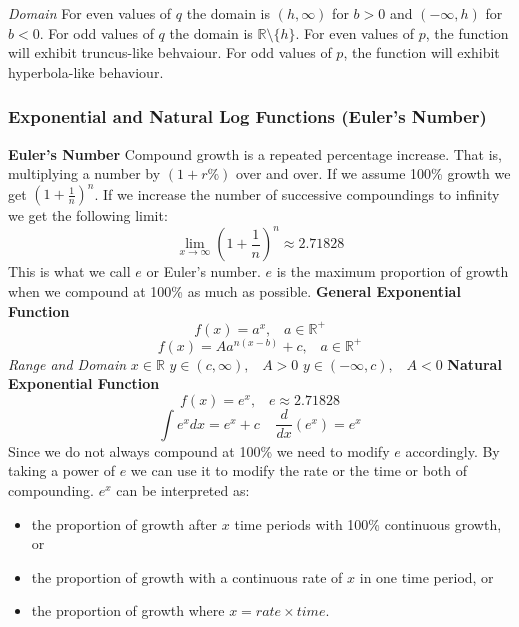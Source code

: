 \documentclass{article}
\begin{document}
				\textit{Domain}\newline
				For even values of $q$ the domain is $(h,\infty)$ for $b>0$ and $(-\infty,h)$ for $b<0$.\newline
				For odd values of $q$ the domain is $\mathbb{R}\setminus\{h\}$.
				\newline\newline
				For even values of $p$, the function will exhibit truncus-like behvaiour. For odd values of $p$, the function will exhibit hyperbola-like behaviour.
			\subsubsection{Exponential and Natural Log Functions (Euler's Number)}
				\textbf{Euler's Number}\newline
				Compound growth is a repeated percentage increase. That is, multiplying a number by $(1+r\%)$ over and over. If we assume 100\% growth we get $(1+\frac{1}{n})^n$. If we increase the number of successive compoundings to infinity we get the following limit:
				\[\lim_{x\to\infty}\left(1+\frac{1}{n}\right)^n\approx2.71828\]
				This is what we call $e$ or Euler's number. $e$ is the maximum proportion of growth when we compound at 100\% as much as possible.\newline\newline
				\textbf{General Exponential Function}
				\[f(x)=a^x,\;\;\;a\in\mathbb{R}^+\]
				\[f(x)=Aa^{n(x-b)}+c,\;\;\;a\in\mathbb{R}^+\]
				\textit{Range and Domain}\newline
				$x\in\mathbb{R}$\newline
				$y\in(c,\infty),\;\;\;A>0$\newline
				$y\in(-\infty,c),\;\;\;A<0$\newline
				\newpage
				\noindent\textbf{Natural Exponential Function}
				\[f(x)=e^x,\;\;\;e\approx2.71828\]
				\[\int e^xdx = e^x + c \;\;\;\; \frac{d}{dx}(e^x)=e^x\]
				Since we do not always compound at 100\% we need to modify $e$ accordingly. By taking a power of $e$ we can use it to modify the rate or the time or both of compounding. $e^x$ can be interpreted as:
				\begin{itemize}
					\item the proportion of growth after $x$ time periods with 100\% continuous growth, or
					\item the proportion of growth with a continuous rate of $x$ in one time period, or
					\item the proportion of growth where $x=rate\times time$.
				\end{itemize}
\end{document}
